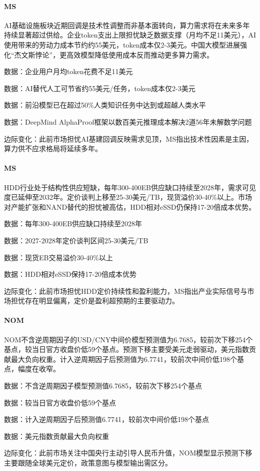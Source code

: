 \documentclass[11pt]{ctexart}
\begin{document}
\paragraph{MS} AI基础设施板块近期回调是技术性调整而非基本面转向，算力需求将在未来多年持续显著超过供给。企业token支出上限担忧缺乏数据支撑（月均不足11美元），AI使用带来的劳动力成本节约约55美元，token成本仅2-3美元。中国大模型进展强化“杰文斯悖论”，更高效模型降低使用成本反而推动更多算力需求。
{\small\color{refgray}数据：企业用户月均token花费不足11美元\par}
{\small\color{refgray}数据：AI替代人工可节省约55美元/任务，token成本仅2-3美元\par}
{\small\color{refgray}数据：前沿模型已在超过50\%人类知识任务中达到或超越人类水平\par}
{\small\color{refgray}数据：DeepMind AlphaProof框架以数百美元推理成本解决2道56年未解数学问题\par}
{\small\color{refgray}边际变化：此前市场担忧AI基建回调反映需求见顶，MS指出技术性因素是主因，算力供不应求格局将延续多年。\par}
\paragraph{MS} HDD行业处于结构性供应短缺，每年300-400EB供应缺口持续至2028年，需求可见度已延伸至2032年。定价谈判上移至25-30美元/TB，现货溢价30-40\%以上。市场对产能扩张和NAND替代的担忧被高估，HDD相对eSSD仍保持17-20倍成本优势。
{\small\color{refgray}数据：每年300-400EB供应缺口持续至2028年\par}
{\small\color{refgray}数据：2027-2028年定价谈判区间25-30美元/TB\par}
{\small\color{refgray}数据：现货EB交易溢价30-40\%以上\par}
{\small\color{refgray}数据：HDD相对eSSD保持17-20倍成本优势\par}
{\small\color{refgray}边际变化：此前市场担忧HDD定价持续性和盈利能力，MS指出产业实际信号与市场担忧存在明显偏离，定价是盈利超预期的主要驱动力。\par}
\paragraph{NOM} NOM不含逆周期因子的USD/CNY中间价模型预测值为6.7685，较前次下移254个基点，较当日官方收盘价低59个基点。预测下移主要受美元走弱驱动，美元指数贡献最大负向权重。计入逆周期因子后预测值为6.7741，较前次中间价低198个基点，幅度在收窄。
{\small\color{refgray}数据：不含逆周期因子模型预测值6.7685，较前次下移254个基点\par}
{\small\color{refgray}数据：较当日官方收盘价低59个基点\par}
{\small\color{refgray}数据：计入逆周期因子后预测值6.7741，较前次中间价低198个基点\par}
{\small\color{refgray}数据：美元指数贡献最大负向权重\par}
{\small\color{refgray}边际变化：此前市场关注中国央行主动引导人民币升值，NOM模型显示预测下移主要跟随全球美元定价，政策意图与模型输出需区分。\par}
\end{document}
